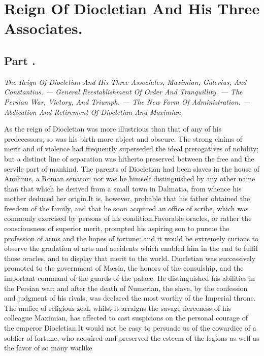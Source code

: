 \chapter{Reign Of Diocletian And His Three Associates.}
\section{Part \thesection.}

\textit{The Reign Of Diocletian And His Three Associates, Maximian,
Galerius, And Constantius. — General Reestablishment Of Order And
Tranquillity. — The Persian War, Victory, And Triumph. — The New Form
Of Administration. — Abdication And Retirement Of Diocletian And
Maximian.}
\vspace{\onelineskip}

As the reign of Diocletian was more illustrious than that of any
of his predecessors, so was his birth more abject and obscure.
The strong claims of merit and of violence had frequently
superseded the ideal prerogatives of nobility; but a distinct
line of separation was hitherto preserved between the free and
the servile part of mankind. The parents of Diocletian had been
slaves in the house of Anulinus, a Roman senator; nor was he
himself distinguished by any other name than that which he
derived from a small town in Dalmatia, from whence his mother
deduced her origin.\footnotemark[1] It is, however, probable that his father
obtained the freedom of the family, and that he soon acquired an
office of scribe, which was commonly exercised by persons of his
condition.\footnotemark[2] Favorable oracles, or rather the consciousness of
superior merit, prompted his aspiring son to pursue the
profession of arms and the hopes of fortune; and it would be
extremely curious to observe the gradation of arts and accidents
which enabled him in the end to fulfil those oracles, and to
display that merit to the world. Diocletian was successively
promoted to the government of Mæsia, the honors of the
consulship, and the important command of the guards of the
palace. He distinguished his abilities in the Persian war; and
after the death of Numerian, the slave, by the confession and
judgment of his rivals, was declared the most worthy of the
Imperial throne. The malice of religious zeal, whilst it arraigns
the savage fierceness of his colleague Maximian, has affected to
cast suspicions on the personal courage of the emperor
Diocletian.\footnotemark[3] It would not be easy to persuade us of the
cowardice of a soldier of fortune, who acquired and preserved the
esteem of the legions as well as the favor of so many warlike
